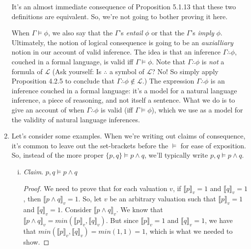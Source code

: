 \begin{enumerate}[\thesection.1]
\begin{itemize}
		\end{itemize}
It's an almost immediate consequence of Proposition 5.1.13 that these two definitions are equivalent. So, we're not going to bother proving it here. 

When $\Gamma\vDash \phi$, we also say that the $\Gamma$'s \emph{entail} $\phi$ or that the $\Gamma$'s \emph{imply} $\phi$. Ultimately, the notion of logical consequence is going to be an \emph{auxialliary} notion in our account of valid inference. The idea is that an inference $\Gamma\therefore \phi$, couched in a formal language, is valid iff $\Gamma\vDash \phi$. Note that $\Gamma\therefore \phi$ is \emph{not} a formula of $\mathcal{L}$ (Ask yourself: Is $\therefore$ a symbol of $\mathcal{L}$? No! So simply apply Proposition 4.2.5 to conclude that $\Gamma\therefore \phi\notin\mathcal{L}$.) The expression $\Gamma\therefore \phi$ is an inference couched in a formal language: it's a model for a natural language inference, a piece of reasoning, and not itself a sentence. What we do is to give an account of when $\Gamma\therefore \phi$ is valid (iff $\Gamma\vDash\phi$), which we use as a model for the validity of natural language inferences.

	\item Let's consider some examples. When we're writing out claims of
		consequence, it's common to leave out the set-brackets before the $\vDash$
		for ease of exposition. So, instead of the more proper $\{p,q\}\vDash
		p\land q$, we'll typically write $p,q\vDash p\land q$.
	
		\begin{enumerate}[(i)]
		
			\item \emph{Claim}. $p,q\vDash p\land q$
			
			\begin{proof}
			We need to prove that for each valuation $v$, if $\llbracket
			p\rrbracket_v=1$ and $\llbracket q\rrbracket_v=1$, then $\llbracket
			p\land q\rrbracket_v=1$. So, let $v$ be an arbitrary valuation such that
			$\llbracket p\rrbracket_v=1$ and $\llbracket q\rrbracket_v=1$. Consider
			$\llbracket p\land q\rrbracket_v$. We know that $\llbracket p\land
			q\rrbracket_v=min(\llbracket p\rrbracket_v, \llbracket q\rrbracket_v)$.
			But since $\llbracket p\rrbracket_v=1$ and $\llbracket q\rrbracket_v=1$,
			we have that $min(\llbracket p\rrbracket_v, \llbracket
			q\rrbracket_v)=min(1,1)=1$, which is what we needed to show.
			\end{proof}
			

\end{enumerate}
\end{enumerate}
